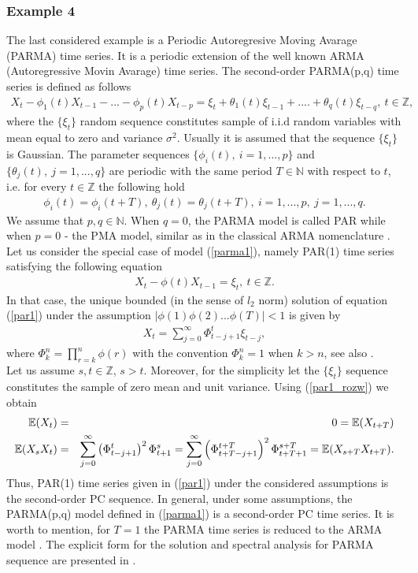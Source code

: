 \subsubsection*{Example 4}
The last considered example is a Periodic Autoregresive Moving Avarage (PARMA)  time series. It is a periodic extension of the well known ARMA (Autoregressive Movin Avarage) time series. The second-order PARMA(p,q) time series is defined as follows \cite{hurd2007periodically,vecchia1985periodic}
\begin{eqnarray}\label{parma1}
X_t-\phi_1(t)X_{t-1}-...-\phi_p(t)X_{t-p}=\xi_{t}+\theta_1(t)\xi_{t-1}+....+\theta_q(t)\xi_{t-q},~t\in \mathbb{Z},
\end{eqnarray}
where the $\{\xi_t\}$ random sequence constitutes sample of i.i.d random variables with mean equal to zero and variance $\sigma^2$. Usually it is assumed that the sequence $\{\xi_t\}$ is Gaussian. The parameter sequences $\{\phi_i(t),~i=1,...,p\}$ and $\{\theta_j(t),~j=1,...,q\}$ are periodic with the same period $T\in \mathbb{N}$ with respect to $t$, i.e. for every $t \in\mathbb{Z}$ the following hold
\begin{eqnarray}
\phi_i(t)=\phi_i(t+T),~\theta_j(t)=\theta_j(t+T),~i=1,...,p,~j=1,...,q.
\end{eqnarray}
We assume that $p,q\in \mathbb{N}$. When $q=0$, the PARMA model is called PAR while when $p=0$ - the PMA model, similar as in the classical ARMA nomenclature \cite{brockwell2016introduction}.
Let us consider the special case of model (\ref{parma1}), namely PAR(1) time series satisfying the following equation
\begin{eqnarray}\label{par1}
X_t-\phi(t)X_{t-1}=\xi_{t},~t\in \mathbb{Z}.
\end{eqnarray}
In that case, the unique bounded (in the sense of $l_2$ norm) solution of equation (\ref{par1}) under the assumption $|\phi(1)\phi(2)...\phi(T)|<1$ is given by \cite{makagon2004bounded}
\begin{eqnarray}\label{par1_rozw}
X_t=\sum_{j=0}^{\infty}\Phi_{t-j+1}^{t}\xi_{t-j},
\end{eqnarray}
where $\Phi_{k}^n=\prod_{r=k}^n\phi(r)$ with the convention $\Phi_k^n=1$ when $k>n$, see also \cite{nowicka2006dependence}.\\
Let us assume $s,t \in \mathbb{Z}$, $s>t$. Moreover, for the simplicity let  the $\{\xi_t\}$ sequence constitutes the sample of zero mean and unit variance. 
Using (\ref{par1_rozw})  we obtain
\begin{eqnarray}\operatorname{\mathbb{E}} (X_t)&=&0=\operatorname{\mathbb{E}} (X_{t+T})\\
\operatorname{\mathbb{E}} (X_sX_t)&=&\sum_{j=0}^{\infty}\left(\Phi_{t-j+1}^t\right)^2\Phi_{t+1}^s=\sum_{j=0}^{\infty}\left(\Phi_{t+T-j+1}^{t+T}\right)^2\Phi_{t+T+1}^{s+T}=\operatorname{\mathbb{E}} (X_{s+T}X_{t+T}).\nonumber\end{eqnarray}
Thus, PAR(1) time series given in (\ref{par1}) under the considered assumptions is the second-order PC sequence. In general, under some assumptions, the PARMA(p,q) model defined in (\ref{parma1}) is a second-order PC time series. It is worth to mention, for $T= 1$ the PARMA time series  is reduced to the  ARMA model \cite{brockwell2016introduction}.
The explicit form for the solution and spectral analysis for PARMA sequence are presented in \cite{wylomanska2008spectral}.
